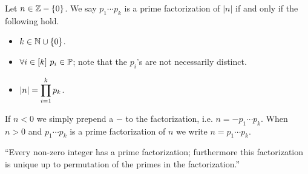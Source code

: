         \begin{definition}
            Let $n \in \mathbb{Z} - \left\{0\right\}$. We say $p_1 \cdots p_k$ is a
            prime factorization of $|n|$ if and only if the following hold.
            \begin{itemize}
                \item
                    $k \in \mathbb{N} \cup \left\{0\right\}$.
                \item
                    $\forall i \in [k] \ p_i \in \mathbb{P}$; note that
                    the $p_i$'s are not necessarily distinct.
                \item
                    $|n| = \displaystyle\prod_{i = 1}^{k} p_k$.
            \end{itemize}
            If $n < 0$ we simply prepend a $-$ to the factorization, i.e.
            $n = -p_1 \cdots p_k$. When $n > 0$ and $p_1 \cdots p_k$ is a prime factorization
            of $n$ we write $n = p_1 \cdots p_k$.
        \end{definition}
        \begin{theorem}
            ``Every non-zero integer has a prime factorization; furthermore this
            factorization is unique up to permutation of the primes in the
            factorization.''
            \label{FTA}
        \end{theorem}
